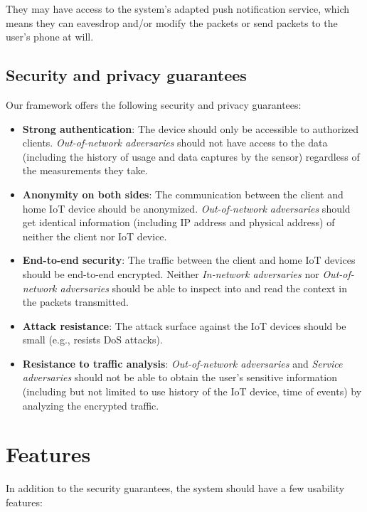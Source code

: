 They may have access to the system's adapted push notification service, which means they can eavesdrop and/or modify the packets or send packets to the user's phone at will.
\subsection{Security and privacy guarantees}

Our framework offers the following security and privacy guarantees:

\begin{itemize}
	\item \textbf{Strong authentication}: The device should only be accessible to authorized clients. \textit{Out-of-network adversaries} should not have access to the data (including the history of usage and data captures by the sensor) regardless of the measurements they take.
	\item \textbf{Anonymity on both sides}: The communication between the client and home IoT device should be anonymized. \textit{Out-of-network adversaries} should get identical information (including IP address and physical address) of neither the client nor IoT device.
	\item \textbf{End-to-end security}: The traffic between the client and home IoT devices should be end-to-end encrypted. Neither \textit{In-network adversaries} nor \textit{Out-of-network adversaries} should be able to inspect into and read the context in the packets transmitted.
	\item \textbf{Attack resistance}: The attack surface against the IoT devices should be small (e.g., resists DoS attacks).
	\item \textbf{Resistance to traffic analysis}: \textit{Out-of-network adversaries} and \textit{Service adversaries} should not be able to obtain the user's sensitive information (including but not limited to use history of the IoT device, time of events) by analyzing the encrypted traffic.
\end{itemize}

\section{Features}
In addition to the security guarantees, the system should have a few usability features:

